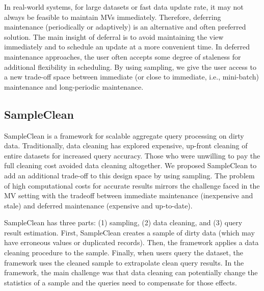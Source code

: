 In real-world systems, for large datasets or fast data update rate, it may not always be feasible to maintain MVs immediately. 
Therefore, deferring maintenance (periodically or adaptively) is an alternative and often preferred solution.
The main insight of deferral is to avoid maintaining the view immediately and to schedule an update at a more convenient time.
In deferred maintenance approaches, the user often accepts some degree of staleness for additional flexibility in scheduling.
By using sampling, we give the user access to a new trade-off space between immediate (or close to immediate, i.e., mini-batch) maintenance and long-periodic maintenance.

\fi


\subsection{SampleClean~\cite{wang1999sample}}
SampleClean is a framework for scalable aggregate query processing on dirty data.
Traditionally, data cleaning has explored expensive, up-front cleaning of entire datasets for increased query accuracy.
Those who were unwilling to pay the full cleaning cost avoided data cleaning altogether.
We proposed SampleClean to add an additional trade-off to this design space by using sampling.
The problem of high computational costs for accurate results mirrors the challenge faced in the MV setting with the tradeoff between immediate maintenance (inexpensive and stale) and deferred maintenance (expensive and up-to-date).

SampleClean has three parts: (1) sampling, (2) data cleaning, and (3) query result estimation.
First, SampleClean creates a sample of dirty data (which may have erroneous values or duplicated records). %
Then, the framework applies a data cleaning procedure to the sample.
Finally, when users query the dataset, the framework uses the cleaned sample to extrapolate clean query results.
In the framework, the main challenge was that data cleaning can potentially change the statistics of a sample and the queries need to compensate for those effects.

